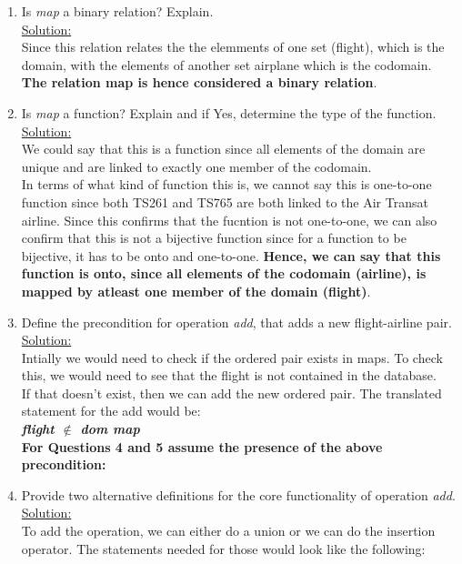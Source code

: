 \begin{enumerate}
  \item Is \emph{map} a binary relation? Explain.\\
  \noindent\underline{Solution:}\\ Since this relation relates the the elemments of one set (flight), which is the domain, with the elements of another set {airplane} which is the codomain. \textbf{The relation map is hence considered a binary relation}.
  \item Is \emph{map} a function? Explain and if Yes, determine the type of the function.\\
  \noindent\underline{Solution:}\\ We could say that this is a function since all elements of the domain are unique and are linked to exactly one member of the codomain.\\
  In terms of what kind of function this is, we cannot say this is one-to-one function since both TS261 and TS765 are both linked to the Air Transat airline. Since this confirms that the fucntion is not one-to-one,
  we can also confirm that this is not a bijective function since for a function to be bijective, it has to be onto and one-to-one. \textbf{Hence, we can say that this function is onto, since all elements of the codomain (airline), is mapped by atleast one member of the domain (flight)}.
  \item Define the precondition for operation \emph{add}, that adds a new flight-airline pair.\\
  \noindent\underline{Solution:}\\ Intially we would need to check if the ordered pair exists in maps. To check this, we would need to see that the flight is not contained in the database.\\
  If that doesn't exist, then we can add the new ordered pair. The translated statement for the add would be:\\
  \textbf{\emph{flight $\notin$ dom map}}\\

  \textbf{For Questions 4 and 5 assume the presence of the above precondition:}\\
  \item Provide two alternative definitions for the core functionality of operation \emph{add}.\\
  \noindent\underline{Solution:}\\ To add the operation, we can either do a union or we can do the insertion operator. The statements needed for those would look like the following:\
\end{enumerate}
